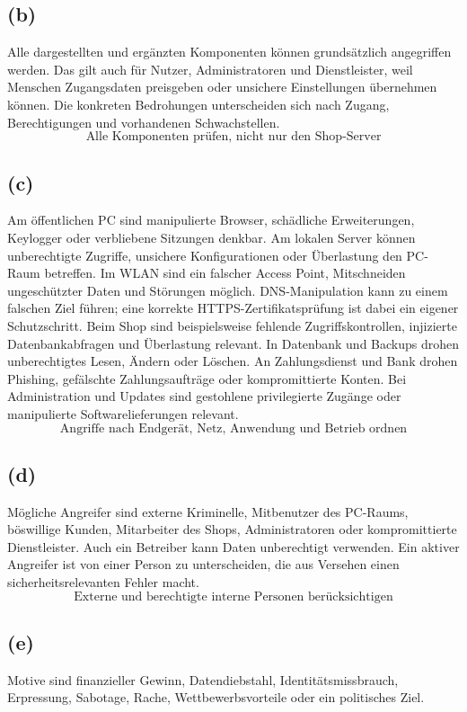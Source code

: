 \documentclass[a4paper,11pt]{article}
\newif\ifexplain
\newcommand{\teil}[1]{\subsection*{(#1)}}
\newcommand{\explain}[1]{\ifexplain\begin{erklbox}#1\end{erklbox}\fi}
\newcommand{\ergebnis}[1]{\[\boxed{\text{#1}}\]}
\begin{document}
\teil{b}
Alle dargestellten und ergänzten Komponenten können grundsätzlich angegriffen werden.
Das gilt auch für Nutzer, Administratoren und Dienstleister, weil Menschen Zugangsdaten preisgeben oder unsichere Einstellungen übernehmen können.
Die konkreten Bedrohungen unterscheiden sich nach Zugang, Berechtigungen und vorhandenen Schwachstellen.
\ergebnis{Alle Komponenten prüfen, nicht nur den Shop-Server}
\explain{Die Aussage bedeutet nicht, dass jede Komponente gleich leicht angreifbar ist. Ein öffentlicher
PC hat andere Risiken als die interne Datenbank. Wir müssen beides prüfen und danach priorisieren.}
\teil{c}
Am öffentlichen PC sind manipulierte Browser, schädliche Erweiterungen, Keylogger oder verbliebene Sitzungen denkbar.
Am lokalen Server können unberechtigte Zugriffe, unsichere Konfigurationen oder Überlastung den PC-Raum betreffen.
Im WLAN sind ein falscher Access Point, Mitschneiden ungeschützter Daten und Störungen möglich.
DNS-Manipulation kann zu einem falschen Ziel führen; eine korrekte HTTPS-Zertifikatsprüfung ist dabei ein eigener Schutzschritt.
Beim Shop sind beispielsweise fehlende Zugriffskontrollen, injizierte Datenbankabfragen und Überlastung relevant.
In Datenbank und Backups drohen unberechtigtes Lesen, Ändern oder Löschen.
An Zahlungsdienst und Bank drohen Phishing, gefälschte Zahlungsaufträge oder kompromittierte Konten.
Bei Administration und Updates sind gestohlene privilegierte Zugänge oder manipulierte Softwarelieferungen relevant.
\ergebnis{Angriffe nach Endgerät, Netz, Anwendung und Betrieb ordnen}
\explain{Wir nennen keine beliebige Angriffsliste, sondern ordnen jeder Komponente passende Wege zu.
TLS kann beispielsweise beim Transport helfen, schützt aber keine Sitzung vor einem Keylogger
auf dem bereits kompromittierten Endgerät.}
\teil{d}
Mögliche Angreifer sind externe Kriminelle, Mitbenutzer des PC-Raums, böswillige Kunden,
Mitarbeiter des Shops, Administratoren oder kompromittierte Dienstleister.
Auch ein Betreiber kann Daten unberechtigt verwenden. Ein aktiver Angreifer ist von einer Person zu unterscheiden,
die aus Versehen einen sicherheitsrelevanten Fehler macht.
\ergebnis{Externe und berechtigte interne Personen berücksichtigen}
\explain{Ein Zugangsausweis oder ein gültiges Konto macht eine Person nicht automatisch vertrauenswürdig.
Für Insider sind gerade ihre vorhandenen Rechte relevant. Unabsichtliche Fehler gehören dagegen
zur Bedrohungsanalyse, ohne die Person als vorsätzlichen Täter zu bezeichnen.}
\teil{e}
Motive sind finanzieller Gewinn, Datendiebstahl, Identitätsmissbrauch, Erpressung, Sabotage,
Rache, Wettbewerbsvorteile oder ein politisches Ziel.
\end{document}
